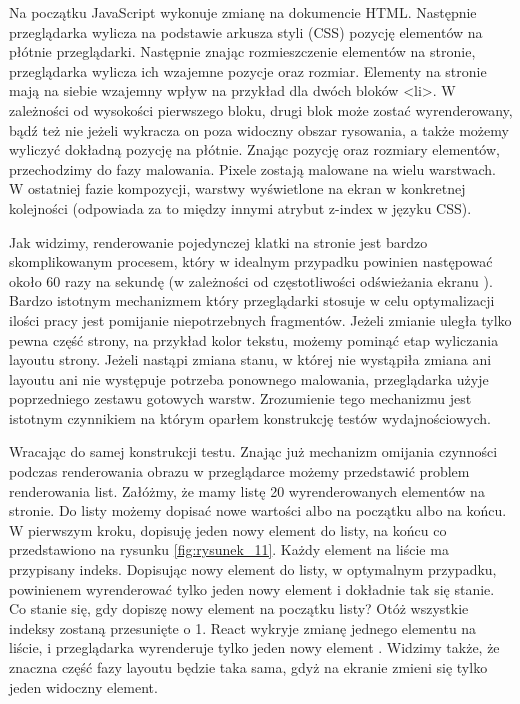 Na początku JavaScript wykonuje zmianę na dokumencie HTML.
Następnie przeglądarka wylicza na podstawie arkusza styli (CSS) pozycję elementów na płótnie przeglądarki.
Następnie znając rozmieszczenie elementów na stronie, przeglądarka wylicza ich wzajemne pozycje oraz rozmiar.
Elementy na stronie mają na siebie wzajemny wpływ na przykład dla dwóch bloków <li>.
W zależności od wysokości pierwszego bloku, drugi blok może zostać wyrenderowany, bądź też nie jeżeli wykracza on poza widoczny obszar rysowania, a także możemy wyliczyć dokładną pozycję na płótnie.
Znając pozycję oraz rozmiary elementów, przechodzimy do fazy malowania.
Pixele zostają malowane na wielu warstwach. W ostatniej fazie kompozycji, warstwy wyświetlone na ekran w konkretnej kolejności (odpowiada za to między innymi atrybut z-index w języku CSS).

Jak widzimy, renderowanie pojedynczej klatki na stronie jest bardzo skomplikowanym procesem, który w idealnym przypadku powinien następować około 60 razy na sekundę (w zależności od  częstotliwości odświeżania ekranu ).
Bardzo istotnym mechanizmem który przeglądarki stosuje w celu optymalizacji ilości pracy jest pomijanie niepotrzebnych fragmentów.
Jeżeli zmianie uległa tylko pewna część strony, na przykład kolor tekstu, możemy pominąć etap wyliczania layoutu strony.
Jeżeli nastąpi zmiana stanu, w której nie wystąpiła zmiana ani layoutu ani nie występuje potrzeba ponownego malowania, przeglądarka użyje poprzedniego zestawu gotowych warstw.
Zrozumienie tego mechanizmu jest istotnym czynnikiem na którym oparłem konstrukcję testów wydajnościowych.

Wracając do samej konstrukcji testu. Znając już mechanizm omijania czynności podczas renderowania obrazu w przeglądarce możemy przedstawić problem renderowania list.
Załóżmy, że mamy listę 20 wyrenderowanych elementów na stronie. Do listy możemy dopisać nowe wartości albo na początku albo na końcu.
W pierwszym kroku, dopisuję jeden nowy element do listy, na końcu co przedstawiono na rysunku \ref{fig:rysunek_11}. Każdy element na liście ma przypisany indeks.
Dopisując nowy element do listy, w optymalnym przypadku, powinienem wyrenderować tylko jeden nowy element i dokładnie tak się stanie. Co stanie się, gdy dopiszę nowy element na początku listy? Otóż wszystkie indeksy zostaną przesunięte o 1.
React wykryje zmianę jednego elementu na liście, i przeglądarka wyrenderuje tylko jeden nowy element . Widzimy także, że znaczna część fazy layoutu będzie taka sama, gdyż na ekranie zmieni się tylko jeden widoczny element.

